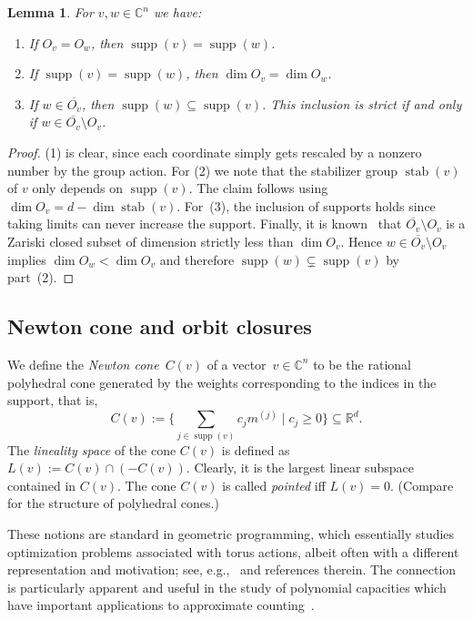 \documentclass[10pt,a4paper]{article}
\DeclareMathOperator{\supp}{supp}
\DeclareMathOperator{\stab}{stab}
\newtheorem{lemma}[theorem]{Lemma}
\theoremstyle{definition}
\numberwithin{equation}{section}
\newcommand{\CC}{\mathbb{C}}
\newcommand{\RR}{\mathbb{R}}
\begin{document}
\begin{lemma} \label{lem:supp-dim}
For $v,w \in \CC^n$ we have:
\begin{enumerate}
\item If $O_v = O_w$, then $\supp(v) = \supp(w)$.
\item If $\supp(v) = \supp(w)$, then $\dim O_v = \dim O_w$.
\item\label{it:supp down cl} If $w \in \overline{O_v}$, then $\supp(w) \subseteq \supp(v)$.
This inclusion is strict if and only if $w \in \overline{O_v} \setminus O_v$.
\end{enumerate}
\end{lemma}
\begin{proof}
(1) is clear, since each coordinate simply gets rescaled by a nonzero number by the group action.
For (2) we note that the stabilizer group $\stab(v)$ of $v$ only depends on $\supp(v)$.
The claim follows using $\dim O_v = d - \dim \stab(v)$.
For~(3), the inclusion of supports holds since taking limits can never increase the support.
Finally, it is known~\cite[\S8.3]{Humphreys:75} that $\overline{O_v} \setminus O_v$ is a Zariski closed subset of dimension
strictly less than $\dim O_v$. Hence $w \in \overline{O_v} \setminus O_v$ implies $\dim O_w < \dim O_v$
and therefore $\supp(w) \subsetneq \supp(v)$ by part~(2).
\end{proof}

%
\subsection{Newton cone and orbit closures}
%
We define the \emph{Newton cone}~$C(v)$ of a vector~$v\in \CC^n$ to be the rational polyhedral cone generated by
the weights corresponding to the indices in the support, that is,
\[
 C(v) := \Big\{\sum_{j\in\supp(v)} c_j m^{(j)} \mid c_j \ge 0 \Big\}\subseteq\RR^d .
\]
The {\em lineality space} of the cone $C(v)$ is defined as
$L(v) := C(v) \cap (-C(v))$. Clearly, it is the largest linear subspace contained in $C(v)$.
The cone $C(v)$ is called {\em pointed} iff $L(v)=0$.
(Compare~\cite{schrijver:86} for the structure of polyhedral cones.)

These notions are standard in geometric programming, which essentially studies optimization problems associated with torus actions, albeit often with a different representation and motivation; see, e.g.,~\cite{BLNW:20} and references therein.
The connection is particularly apparent and useful in the study of polynomial capacities which have important applications to approximate counting~\cite{linial2000deterministic,gurvits2004combinatorial}.
\end{document}
